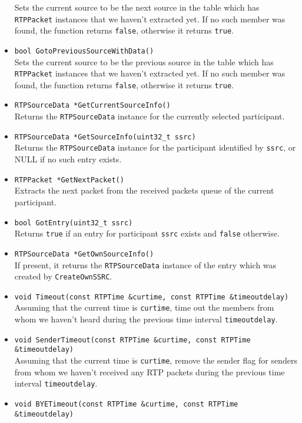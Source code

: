 \documentclass[12pt,a4paper]{article}
\begin{document}
\begin{itemize}
						Sets the current source to be the next source in the table
						which has {\tt RTPPacket} instances that we haven't extracted
						yet. If no such member was found, the function returns {\tt false},
						otherwise it returns {\tt true}.
					\item {\tt bool GotoPreviousSourceWithData()}\\
						Sets the current source to be the previous source in the table
						which has {\tt RTPPacket} instances that we haven't extracted
						yet. If no such member was found, the function returns {\tt false},
						otherwise it returns {\tt true}.
					\item {\tt RTPSourceData *GetCurrentSourceInfo()}\\
						Returns the {\tt RTPSourceData} instance for the currently
						selected participant.
					\item {\tt RTPSourceData *GetSourceInfo(uint32\_t ssrc)}\\
						Returns the {\tt RTPSourceData} instance for the participant
						identified by {\tt ssrc}, or NULL if no such entry exists.
					\item {\tt RTPPacket *GetNextPacket()}\\
						Extracts the next packet from the received packets queue
						of the current participant.
					\item {\tt bool GotEntry(uint32\_t ssrc)}\\
						Returns {\tt true} if an entry for participant {\tt ssrc} exists
						and {\tt false} otherwise.
					\item {\tt RTPSourceData *GetOwnSourceInfo()}\\
						If present, it returns the {\tt RTPSourceData} instance of
						the entry which was created by {\tt CreateOwnSSRC}.
					\item {\tt void Timeout(const RTPTime \&curtime, const RTPTime \&timeoutdelay)}\\
						Assuming that the current time is {\tt curtime}, time out the
						members from whom we haven't heard during the previous time
						interval {\tt timeoutdelay}.
					\item {\tt void SenderTimeout(const RTPTime \&curtime, const RTPTime \&timeoutdelay)}\\
						Assuming that the current time is {\tt curtime}, remove the
						sender flag for senders from whom we haven't received any RTP
						packets during the previous time interval {\tt timeoutdelay}.
					\item {\tt void BYETimeout(const RTPTime \&curtime, const RTPTime \&timeoutdelay)}\\

\end{itemize}
\end{document}
